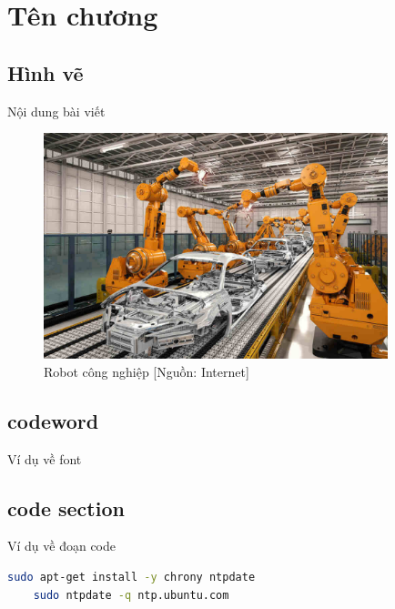 \chapter{Tên chương}

\section{Hình vẽ}

Nội dung bài viết

\begin{figure}[hpt]
  \centering
  \includegraphics[width=10cm]{figures/IndustrialRobot.jpg}
  \caption[Robot công nghiệp]{Robot công nghiệp [Nguồn: Internet]}
  \label{fig:RBCongNghiep}
\end{figure}

\section{codeword}

Ví dụ về font 

\section{code section}

Ví dụ về đoạn code

\begin{lstlisting}[numbers=none, language=bash]
	sudo apt-get install -y chrony ntpdate
	sudo ntpdate -q ntp.ubuntu.com
\end{lstlisting}